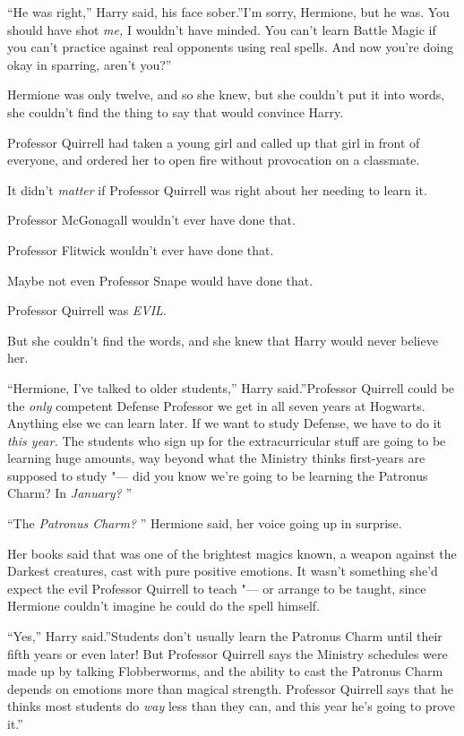 ``He was right,'' Harry said, his face sober.''I'm sorry, Hermione, but
he was. You should have shot \emph{me,} I wouldn't have minded. You
can't learn Battle Magic if you can't practice against real opponents
using real spells. And now you're doing okay in sparring, aren't you?''

Hermione was only twelve, and so she knew, but she couldn't put it into
words, she couldn't find the thing to say that would convince Harry.

Professor Quirrell had taken a young girl and called up that girl in
front of everyone, and ordered her to open fire without provocation on a
classmate.

It didn't \emph{matter} if Professor Quirrell was right about her
needing to learn it.

Professor McGonagall wouldn't ever have done that.

Professor Flitwick wouldn't ever have done that.

Maybe not even Professor Snape would have done that.

Professor Quirrell was \emph{EVIL}.

But she couldn't find the words, and she knew that Harry would never
believe her.

``Hermione, I've talked to older students,'' Harry said.''Professor
Quirrell could be the \emph{only} competent Defense Professor we get in
all seven years at Hogwarts. Anything else we can learn later. If we
want to study Defense, we have to do it \emph{this year.} The students
who sign up for the extracurricular stuff are going to be learning huge
amounts, way beyond what the Ministry thinks first-years are supposed to
study "--- did you know we're going to be learning the Patronus Charm? In
\emph{January?} ''

``The \emph{Patronus Charm?} '' Hermione said, her voice going up in
surprise.

Her books said that was one of the brightest magics known, a weapon
against the Darkest creatures, cast with pure positive emotions. It
wasn't something she'd expect the evil Professor Quirrell to teach "--- or
arrange to be taught, since Hermione couldn't imagine he could do the
spell himself.

``Yes,'' Harry said.''Students don't usually learn the Patronus Charm
until their fifth years or even later! But Professor Quirrell says the
Ministry schedules were made up by talking Flobberworms, and the ability
to cast the Patronus Charm depends on emotions more than magical
strength. Professor Quirrell says that he thinks most students do
\emph{way} less than they can, and this year he's going to prove it.''

